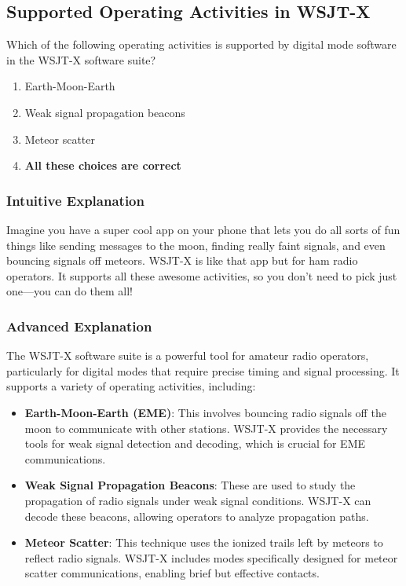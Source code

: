 \subsection{Supported Operating Activities in WSJT-X}
\label{T8D10}

\begin{tcolorbox}[colback=gray!10!white,colframe=black!75!black,title=T8D10]
Which of the following operating activities is supported by digital mode software in the WSJT-X software suite?
\begin{enumerate}[label=\Alph*)]
    \item Earth-Moon-Earth
    \item Weak signal propagation beacons
    \item Meteor scatter
    \item \textbf{All these choices are correct}
\end{enumerate}
\end{tcolorbox}

\subsubsection{Intuitive Explanation}
Imagine you have a super cool app on your phone that lets you do all sorts of fun things like sending messages to the moon, finding really faint signals, and even bouncing signals off meteors. WSJT-X is like that app but for ham radio operators. It supports all these awesome activities, so you don’t need to pick just one—you can do them all!

\subsubsection{Advanced Explanation}
The WSJT-X software suite is a powerful tool for amateur radio operators, particularly for digital modes that require precise timing and signal processing. It supports a variety of operating activities, including:

\begin{itemize}
    \item \textbf{Earth-Moon-Earth (EME)}: This involves bouncing radio signals off the moon to communicate with other stations. WSJT-X provides the necessary tools for weak signal detection and decoding, which is crucial for EME communications.
    \item \textbf{Weak Signal Propagation Beacons}: These are used to study the propagation of radio signals under weak signal conditions. WSJT-X can decode these beacons, allowing operators to analyze propagation paths.
    \item \textbf{Meteor Scatter}: This technique uses the ionized trails left by meteors to reflect radio signals. WSJT-X includes modes specifically designed for meteor scatter communications, enabling brief but effective contacts.
\end{itemize}

